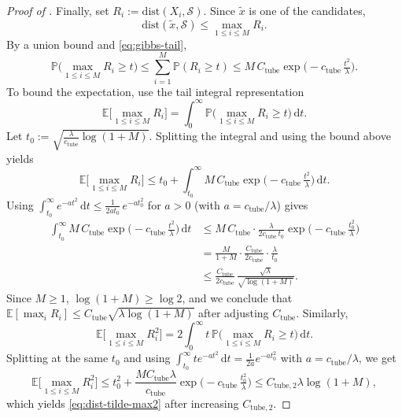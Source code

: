 \documentclass{article}
\theoremstyle{normaltheorem}
\newcommand{\ud}{\mathrm{d}}
\begin{document}
\begin{proof}[Proof of ]
	Finally, set \(R_i:=\mathrm{dist}(X_i,\mathcal{S})\). Since \(\tilde x\) is one of the candidates,
	\[
	\mathrm{dist}(\tilde x,\mathcal{S})\le \max_{1\le i\le M}R_i.
	\]
	By a union bound and \eqref{eq:gibbs-tail},
		\[
		\mathbb P\!\Big(\max_{1\le i\le M} R_i\ge t\Big)
		\le \sum_{i=1}^M \mathbb P(R_i\ge t)
		\le M\,C_{\mathrm{tube}}\exp\!\Big(-c_{\mathrm{tube}}\,\tfrac{t^2}{\lambda}\Big).
		\]
		To bound the expectation, use the tail integral representation
		\[
		\mathbb E\Big[\max_{1\le i\le M} R_i\Big]
		=\int_0^\infty \mathbb P\!\Big(\max_{1\le i\le M} R_i\ge t\Big)\,\ud t.
		\]
		Let $t_0:=\sqrt{\frac{\lambda}{c_{\mathrm{tube}}}\log(1+M)}$. Splitting the integral and using the bound above yields
		\[
		\mathbb E\Big[\max_{1\le i\le M} R_i\Big]
		\le t_0 + \int_{t_0}^\infty M\,C_{\mathrm{tube}}\exp\!\Big(-c_{\mathrm{tube}}\,\tfrac{t^2}{\lambda}\Big)\,\ud t.
		\]
		Using $\int_{t_0}^\infty e^{-a t^2}\,\ud t\le \frac{1}{2 a t_0}\,e^{-a t_0^2}$ for $a>0$ (with $a=c_{\mathrm{tube}}/\lambda$) gives
			\begin{align*}
			\int_{t_0}^\infty M\,C_{\mathrm{tube}}\exp\!\Big(-c_{\mathrm{tube}}\,\tfrac{t^2}{\lambda}\Big)\,\ud t
			&\le M\,C_{\mathrm{tube}}\cdot\frac{\lambda}{2c_{\mathrm{tube}}\,t_0}\exp\!\Big(-c_{\mathrm{tube}}\,\tfrac{t_0^2}{\lambda}\Big)\\
			&= \frac{M}{1+M}\cdot\frac{C_{\mathrm{tube}}}{2c_{\mathrm{tube}}}\cdot\frac{\lambda}{t_0}\\
			&\le \frac{C_{\mathrm{tube}}}{2c_{\mathrm{tube}}}\,\frac{\sqrt{\lambda}}{\sqrt{\log(1+M)}}.
			\end{align*}
		Since \(M\ge1\), \(\log(1+M)\ge \log 2\), and we conclude that
		$\mathbb E[\max_i R_i]\le C_{\mathrm{tube}}\sqrt{\lambda\log(1+M)}$ after adjusting $C_{\mathrm{tube}}$.
		Similarly,
		\[
		\mathbb E\Big[\max_{1\le i\le M} R_i^2\Big]
		=
		2\int_0^\infty t\,\mathbb P\!\Big(\max_{1\le i\le M} R_i\ge t\Big)\,\ud t.
		\]
		Splitting at the same $t_0$ and using $\int_{t_0}^\infty t e^{-a t^2}\,\ud t=\frac{1}{2a}e^{-a t_0^2}$ with $a=c_{\mathrm{tube}}/\lambda$, we get
		\[
		\mathbb E\Big[\max_{1\le i\le M} R_i^2\Big]
		\le
		t_0^2+\frac{M C_{\mathrm{tube}}\lambda}{c_{\mathrm{tube}}}\exp\!\Big(-c_{\mathrm{tube}}\,\tfrac{t_0^2}{\lambda}\Big)
		\le
		C_{\mathrm{tube},2}\lambda\log(1+M),
		\]
		which yields \eqref{eq:dist-tilde-max2} after increasing $C_{\mathrm{tube},2}$.
\end{proof}
\end{document}
